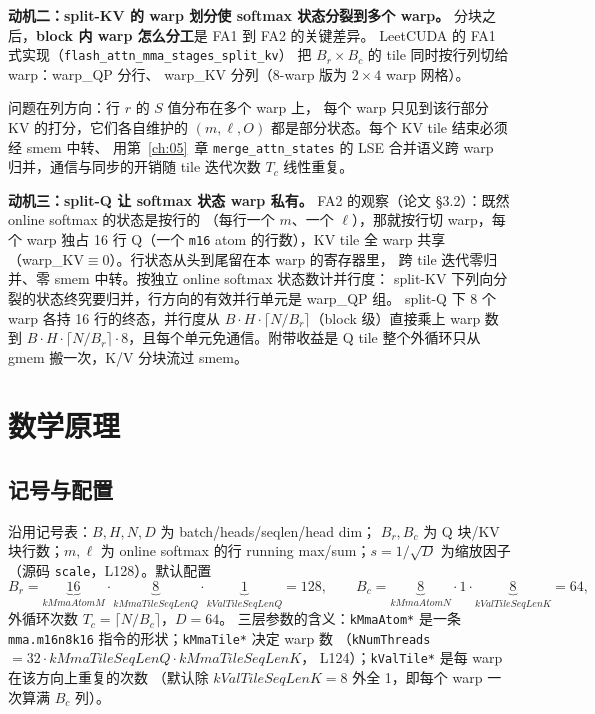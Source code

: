\textbf{动机二：split-KV 的 warp 划分使 softmax 状态分裂到多个 warp。}
分块之后，\textbf{block 内 warp 怎么分工}是 FA1 到 FA2 的关键差异。
LeetCUDA 的 FA1 式实现（\texttt{flash\_\allowbreak{}attn\_\allowbreak{}mma\_\allowbreak{}stages\_\allowbreak{}split\_\allowbreak{}kv}）
把 $B_r\times B_c$ 的 tile 同时按行列切给 warp：warp\_QP 分行、
warp\_KV 分列（8-warp 版为 $2\times4$ warp 网格）。

问题在列方向：行 $r$ 的 $S$ 值分布在多个 warp 上，
每个 warp 只见到该行部分 KV 的打分，它们各自维护的
$(m,\ell,O)$ 都是部分状态。每个 KV tile 结束必须经 smem 中转、
用第~\ref{ch:05}~章 \texttt{merge\_\allowbreak{}attn\_\allowbreak{}states} 的 LSE 合并语义跨
warp 归并，通信与同步的开销随 tile 迭代次数 $T_c$ 线性重复。

\textbf{动机三：split-Q 让 softmax 状态 warp 私有。}
FA2 的观察（论文 §3.2）：既然 online softmax 的状态是按行的
（每行一个 $m$、一个 $\ell$），那就按行切 warp，每个 warp 独占
16 行 Q（一个 \texttt{m16} atom 的行数），KV tile 全 warp 共享
（warp\_KV$\equiv$0）。行状态从头到尾留在本 warp 的寄存器里，
跨 tile 迭代零归并、零 smem 中转。按独立 online softmax 状态数计并行度：
split-KV 下列向分裂的状态终究要归并，行方向的有效并行单元是 warp\_QP 组。
split-Q 下 8 个 warp 各持 16 行的终态，并行度从
$B\cdot H\cdot\lceil N/B_r\rceil$（block 级）直接乘上 warp 数到
$B\cdot H\cdot\lceil N/B_r\rceil\cdot 8$，且每个单元免通信。附带收益是
Q tile 整个外循环只从 gmem 搬一次，K/V 分块流过 smem。

\section{数学原理}

\subsection{记号与配置}

沿用记号表：$B,H,N,D$ 为 batch/heads/seqlen/head dim；
$B_r,B_c$ 为 Q 块/KV 块行数；$m,\ell$ 为 online softmax 的行
running max/sum；$s = 1/\sqrt{D}$ 为缩放因子（源码
\texttt{scale}，L128）。默认配置
\begin{equation}
  B_r = \underbrace{16}_{kMmaAtomM}\cdot\underbrace{8}_{kMmaTileSeqLenQ}\cdot\underbrace{1}_{kValTileSeqLenQ} = 128,\qquad
  B_c = \underbrace{8}_{kMmaAtomN}\cdot 1\cdot\underbrace{8}_{kValTileSeqLenK} = 64,
  \label{eq:16-brbc}
\end{equation}
外循环次数 $T_c=\lceil N/B_c\rceil$，$D=64$。
三层参数的含义：\texttt{kMmaAtom*} 是一条 \texttt{mma.\allowbreak{}m16n8k16}
指令的形状；\texttt{kMmaTile*} 决定 warp 数
（\texttt{kNumThreads}$=32\cdot kMmaTileSeqLenQ\cdot kMmaTileSeqLenK$，
L124）；\texttt{kValTile*} 是每 warp 在该方向上重复的次数
（默认除 $kValTileSeqLenK{=}8$ 外全 1，即每个 warp 一次算满 $B_c$ 列）。

